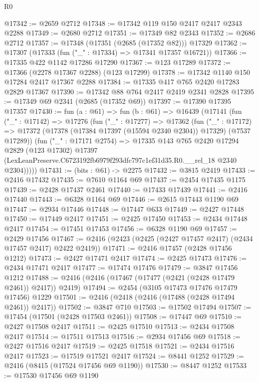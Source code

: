 \begin{lexlean}{R0}
\begin{coremodule}
@17342 := @2659 @2712
@17348 := @17342 @119 @150 @2417 @2417 @2343 @2288
@17349 := @2680 @2712
@17351 := @17349 @82 @2343
@17352 := @2686 @2712
@17357 := @17348 (@17351 (@2685 (@17352 @82))) @17329
@17362 := @17307 (@17333 (fun ("_" : @17334) => @17341 @17357 @16721))
@17366 := @17335 @422 @1142 @17286 @17290
@17367 := @123 @17289
@17372 := @17366 (@2278 @17367 @2288) (@123 @17299)
@17378 := @17342 @1140 @150 @17284 @2417 @17367 @2288
@17384 := @17335 @417 @765 @2420 @17283 @2829 @17367
@17390 := @17342 @88 @764 @2417 @2419 @2341 @2828
@17395 := @17349 @69 @2341 (@2685 (@17352 @69))
@17397 := @17390 @17395 @17357
@17430 := fun (a : @61) =>
  fun (b : @61) =>
  @16439
    (@17141
      (fun ("_" : @17142) =>
      @17276
        (fun ("_" : @17277) =>
        @17362
          (fun ("_" : @17172) =>
          @17372 (@17378 (@17384 @17397 (@15594 @2340 @2304)) @17329) (@7537 @17289))
          (fun ("_" : @17171 @2754) =>
          @17335
            @143
            @765
            @2420
            @17294
            @2829
            (@123 @17302)
            @17397
            (LexLeanPreserve.C6723192fb6979f293dfc797c1ef31d35.R0.__rel_18 @2340 @2304)))))
@17431 := (bits : @61) -> @2275
@17432 := @3815 @2419
@17433 := @2416 @17432
@17435 := @7610 @1164 @69
@17437 := @2454 @17435 @1175
@17439 := @2428 @17437 @2461
@17440 := @17433 @17439
@17441 := @2416 @17440
@17443 := @6328 @1164 @69
@17446 := @2615 @17443 @1190 @69
@17447 := @2934 @17446
@17448 := @17447 @633
@17449 := @2427 @17448
@17450 := @17449 @2417
@17451 := @2425 @17450
@17453 := @2434 @17448 @2417
@17454 := @17451 @17453
@17456 := @6328 @1190 @69
@17457 := @2429 @17456
@17467 := @2416 (@2423 (@2425 (@2427 @17457 @2417) (@2434 @17457 @2417) @2422 @2419))
@17471 := @2416 @17457 (@2428 @17456 @1212)
@17473 := @2427 @17471 @2417
@17474 := @2425 @17473
@17476 := @2434 @17471 @2417
@17477 := @17474 @17476
@17479 := @3847 @17456 @1212
@17488 := @2416 (@2416 (@17467 (@17477 (@2421 (@2428 @17479 @2461)) @2417)) @2419)
@17494 := @2454 (@3105 @17473 @17476 @17479 @17456) @1229
@17501 := @2416 (@2418 (@2416 (@17488 (@2428 @17494 @2461)) @2417))
@17502 := @3847 @710
@17503 := @17502 @17494
@17507 := @17454 (@17501 (@2428 @17503 @2461))
@17508 := @17447 @69
@17510 := @2427 @17508 @2417
@17511 := @2425 @17510
@17513 := @2434 @17508 @2417
@17514 := @17511 @17513
@17516 := @2934 @17456 @69
@17518 := @2427 @17516 @2417
@17519 := @2425 @17518
@17521 := @2434 @17516 @2417
@17523 := @17519 @17521 @2417
@17524 := @8441 @1252
@17529 := @2416 (@8415 (@17524 @17456 @69 @1190))
@17530 := @8447 @1252
@17533 := @17530 @17456 @69 @1190

\end{coremodule}
\end{lexlean}
